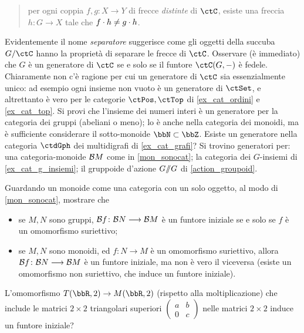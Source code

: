 \begin{esercizi}
 \begin{quote}
  per ogni coppia \(f,g \colon X \to Y\) di frecce \emph{distinte} di \(\ctC\), esiste una freccia \(h \colon G \to X\) tale che \(f\cdot h\ne g\cdot h\).
 \end{quote}
 Evidentemente il nome \emph{separatore} suggerisce come gli oggetti della succuba \(G/\ctC\) hanno la proprietà di separare le frecce di \(\ctC\). Osservare (è immediato) che \(G\) è un generatore di \(\ctC\) se e solo se il funtore \(\Hom{\ctC}(G,-)\) è fedele. Chiaramente non c'è ragione per cui un generatore di \(\ctC\) sia essenzialmente unico: ad esempio ogni insieme non vuoto è un generatore di \(\ctSet\), e altrettanto è vero per le categorie \(\ctPos,\ctTop\) di \ref{ex_cat_ordini} e \ref{ex_cat_top}. Si provi che l'insieme dei numeri interi è un generatore per la categoria dei gruppi (abeliani o meno); lo è anche nella categoria dei monoidi, ma è sufficiente considerare il sotto-monoide \(\bbN\subset\bbZ\). Esiste un generatore nella categoria \(\ctdGph\) dei multidigrafi di \ref{ex_cat_grafi}? Si trovino generatori per: una categoria-monoide \(\mathcal{B} M\) come in \ref{mon_sonocat}; la categoria dei \(G\)-insiemi di \ref{ex_cat_g_insiemi}; il gruppoide d'azione \(G/\!\!/G\) di \ref{action_groupoid}.
 \item \label{ex_monepi_5} Guardando un monoide come una categoria con un solo oggetto, al modo di \ref{mon_sonocat}, mostrare che
 \begin{itemize}
  \item se \(M,N\) sono gruppi, \(\mathcal{B} f \colon \mathcal{B} N\longrightarrow \mathcal{B} M\) è un funtore iniziale se e solo se \(f\) è un omomorfismo suriettivo;
  \item se \(M,N\) sono monoidi, ed \(f \colon N\to M\) è un omomorfismo suriettivo, allora \(\mathcal{B} f \colon \mathcal{B} N\longrightarrow \mathcal{B} M\) è un funtore iniziale, ma non è vero il viceversa (esiste un omomorfismo non suriettivo, che induce un funtore iniziale). %
 \end{itemize}
 L'omomorfismo \(T(\bbR,2) \to M(\bbR,2)\) (rispetto alla moltiplicazione) che include le matrici \(2\times 2\) triangolari superiori \(\left(\begin{smallmatrix} a	&	b\\ 0 & c		\end{smallmatrix}\right)\)	nelle matrici \(2\times 2\) induce un funtore iniziale?
\end{esercizi}
